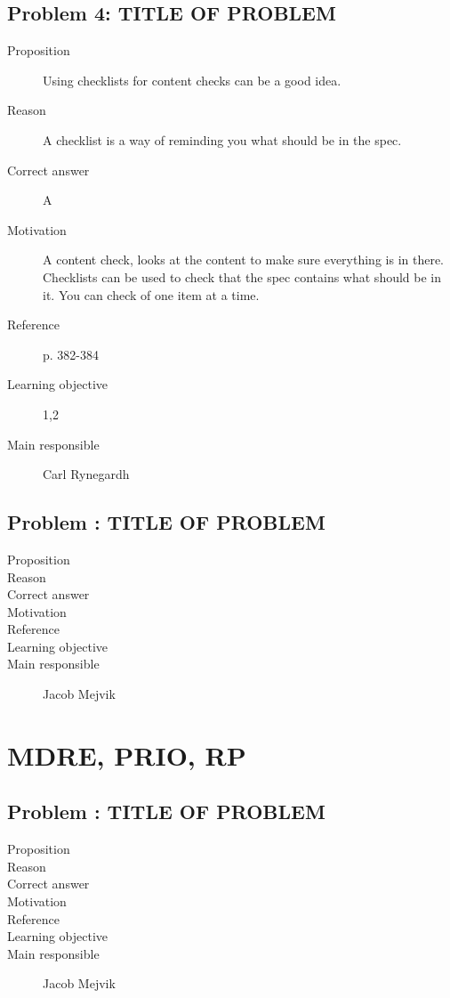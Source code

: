 \documentclass[10pt,a4paper]{article}
\begin{document}
\subsection*{Problem 4: TITLE OF PROBLEM}
\begin{description}
\item[Proposition] Using checklists for content checks can be a good idea.
\item[Reason] A checklist is a way of reminding you what should be in the spec.
\item[Correct answer] A
\item[Motivation] A content check, looks at the content to make sure everything is in there. Checklists can be used to check that the spec contains what should be in it. You can check of one item at a time.
\item[Reference] p. 382-384
\item[Learning objective] 1,2
\item[Main responsible] Carl Rynegardh
\end{description}

\subsection*{Problem : TITLE OF PROBLEM}
\begin{description}
\item[Proposition] 
\item[Reason] 
\item[Correct answer]
\item[Motivation]
\item[Reference]
\item[Learning objective]
\item[Main responsible] Jacob Mejvik
\end{description}

\section*{MDRE, PRIO, RP}
\subsection*{Problem : TITLE OF PROBLEM}
\begin{description}
\item[Proposition] 
\item[Reason] 
\item[Correct answer]
\item[Motivation]
\item[Reference]
\item[Learning objective]
\item[Main responsible] Jacob Mejvik
\end{description}
\end{document}
